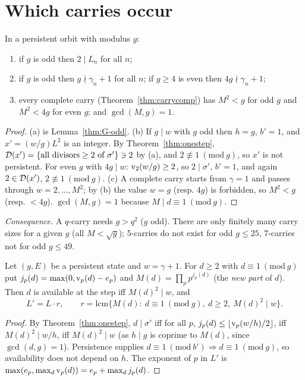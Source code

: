 \section{Which carries occur}

\begin{theorem}\label{thm:window}
In a persistent orbit with modulus \(g\):
\begin{enumerate}[label=(\alph*),nosep]
\item if \(g\) is odd then \(2\mid L_n\) for all \(n\);
\item if \(g\) is odd then \(g\nmid\gamma_n+1\) for all \(n\); if \(g\ge4\) is even then \(4g\nmid\gamma_n+1\);
\item every complete carry (Theorem~\ref{thm:carrycomp}) has \(M^2<g\) for odd \(g\) and \(M^2<4g\) for even \(g\); and \(\gcd(M,g)=1\).
\end{enumerate}
\end{theorem}
\begin{proof}
(a) is Lemma~\ref{thm:G-odd}. (b) If \(g\mid w\) with \(g\) odd then \(h=g\), \(b'=1\), and \(x'=(w/g)L^2\) is an integer. By Theorem~\ref{thm:onestep}, \(\mathcal{D}(x')=\{\text{all divisors}\ge2\text{ of }\sigma'\}\ni2\) by (a), and \(2\not\equiv1\ (\mathrm{mod}\ g)\), so \(x'\) is not persistent. For even \(g\) with \(4g\mid w\): \(\operatorname{v}_2(w/g)\ge2\), so \(2\mid\sigma'\), \(b'=1\), and again \(2\in\mathcal{D}(x')\), \(2\not\equiv1\ (\mathrm{mod}\ g)\). (c) A complete carry starts from \(\gamma=1\) and passes through \(w=2,\dots,M^2\); by (b) the value \(w=g\) (resp. \(4g\)) is forbidden, so \(M^2<g\) (resp. \(<4g\)). \(\gcd(M,g)=1\) because \(M\mid d\equiv1\ (\mathrm{mod}\ g)\).
\end{proof}

\emph{Consequence.} A \(q\)-carry needs \(g>q^2\) (\(g\) odd). There are only finitely many carry sizes for a given \(g\) (all \(M<\sqrt g\)); 5-carries do not exist for odd \(g\le25\), 7-carries not for odd \(g\le49\).

\begin{theorem}\label{thm:absorb}
Let \((g,E)\) be a persistent state and \(w=\gamma+1\). For \(d\ge2\) with \(d\equiv1\ (\mathrm{mod}\ g)\) put \(j_p(d)=\max(0,\operatorname{v}_p(d)-e_p)\) and \(M(d)=\prod_pp^{j_p(d)}\) (the \emph{new part} of \(d\)). Then \(d\) is available at the step iff \(M(d)^2\mid w\), and
\[
L'=L\cdot r,\qquad r=\mathrm{lcm}\{M(d):\ d\equiv1\ (\mathrm{mod}\ g),\ d\ge2,\ M(d)^2\mid w\}.
\]
\end{theorem}
\begin{proof}
By Theorem~\ref{thm:onestep}, \(d\mid\sigma'\) iff for all \(p\), \(j_p(d)\le\lfloor\operatorname{v}_p(w/h)/2\rfloor\), iff \(M(d)^2\mid w/h\), iff \(M(d)^2\mid w\) (as \(h\mid g\) is coprime to \(M(d)\), since \(\gcd(d,g)=1\)). Persistence supplies \(d\equiv1\ (\mathrm{mod}\ b')\Rightarrow d\equiv1\ (\mathrm{mod}\ g)\), so availability does not depend on \(h\). The exponent of \(p\) in \(L'\) is \(\max(e_p,\max_d\operatorname{v}_p(d))=e_p+\max_dj_p(d)\).
\end{proof}

